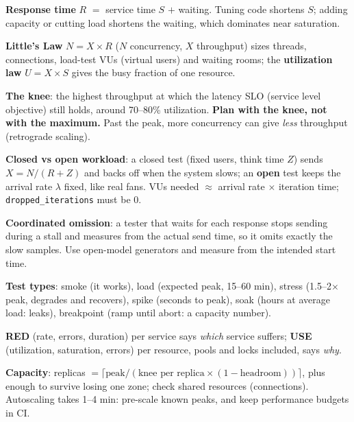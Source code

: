 \stages{\stClarify\ \stEstimate\ \stDeep}

\begin{know}
  \item \textbf{Response time} $R$ $=$ service time $S$ $+$ waiting. Tuning code shortens $S$; adding capacity or cutting load shortens the waiting, which dominates near saturation.
  \item \textbf{Little's Law} $N = X \times R$ ($N$ concurrency, $X$ throughput) sizes threads, connections, load-test VUs (virtual users) and waiting rooms; the \textbf{utilization law} $U = X \times S$ gives the busy fraction of one resource.
  \item \textbf{The knee}: the highest throughput at which the latency SLO (service level objective) still holds, around 70--80\% utilization. \textbf{Plan with the knee, not with the maximum.} Past the peak, more concurrency can give \emph{less} throughput (retrograde scaling).
  \item \textbf{Closed vs open workload}: a closed test (fixed users, think time $Z$) sends $X = N/(R + Z)$ and backs off when the system slows; an \textbf{open} test keeps the arrival rate $\lambda$ fixed, like real fans. VUs needed $\approx$ arrival rate $\times$ iteration time; \texttt{dropped\_iterations} must be 0.
  \item \textbf{Coordinated omission}: a tester that waits for each response stops sending during a stall and measures from the actual send time, so it omits exactly the slow samples. Use open-model generators and measure from the intended start time.
  \item \textbf{Test types}: smoke (it works), load (expected peak, 15--60 min), stress (1.5--2$\times$ peak, degrades and recovers), spike (seconds to peak), soak (hours at average load: leaks), breakpoint (ramp until abort: a capacity number).
  \item \textbf{RED} (rate, errors, duration) per service says \emph{which} service suffers; \textbf{USE} (utilization, saturation, errors) per resource, pools and locks included, says \emph{why}.
  \item \textbf{Capacity}: replicas $= \lceil \text{peak} / (\text{knee per replica} \times (1 - \text{headroom})) \rceil$, plus enough to survive losing one zone; check shared resources (connections). Autoscaling takes 1--4 min: pre-scale known peaks, and keep performance budgets in CI.
\end{know}

